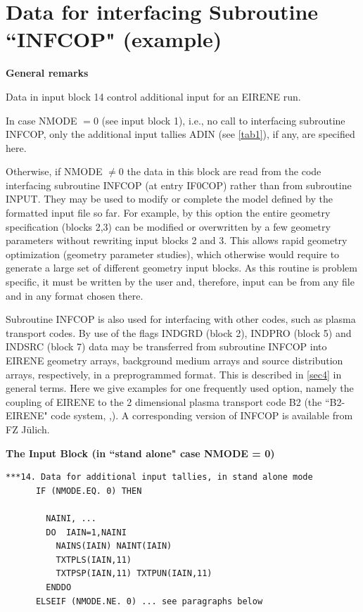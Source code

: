 \section{Data for interfacing Subroutine ``INFCOP" (example)} \label{sec2.14}

\textbf{General remarks}

\medskip

Data in input block 14 control additional input for an EIRENE run.
%

In case NMODE $= 0$ (see input block 1), i.e., no call to interfacing
subroutine INFCOP, only the additional input tallies ADIN (see \cref{tab1}), if
any, are specified here.

Otherwise, if NMODE $\neq 0$ the data in this block are read from the code
interfacing subroutine INFCOP (at entry IF0COP) rather than from subroutine
INPUT.
They may be used to modify or complete the model defined by the formatted input
file so far.
For example, by this option the entire geometry specification (blocks 2,3) can
be modified or overwritten by a few geometry parameters without rewriting input
blocks 2 and 3.
This allows rapid geometry optimization (geometry parameter studies), which
otherwise would require to generate a large set of different geometry input
blocks.
As this routine is problem specific, it must be written by the user and,
therefore, input can be from any file and in any format chosen there.

Subroutine INFCOP is also used for interfacing with other codes, such as plasma
transport codes.
By use of the flags INDGRD (block 2), INDPRO (block 5) and INDSRC (block 7)
data may be transferred from subroutine INFCOP into EIRENE geometry arrays,
background medium arrays and source distribution arrays, respectively, in a
preprogrammed format.
This is described in \cref{sec4} in general terms.
Here we give examples for one frequently used option, namely the coupling of
EIRENE to the 2 dimensional plasma transport code B2 \cite{kn:Braams} (the
``B2-EIRENE" code system, \cite{kn:Reiter91b},\cite{kn:Reiter92b}).
A corresponding version of INFCOP is available from FZ J\"ulich.

\textbf{The Input Block (in ``stand alone" case NMODE = 0)}

\begin{lstlisting}
***14. Data for additional input tallies, in stand alone mode
      IF (NMODE.EQ. 0) THEN

        NAINI, ...
        DO  IAIN=1,NAINI
          NAINS(IAIN) NAINT(IAIN)
          TXTPLS(IAIN,11)
          TXTPSP(IAIN,11) TXTPUN(IAIN,11)
        ENDDO
      ELSEIF (NMODE.NE. 0) ... see paragraphs below
\end{lstlisting}

